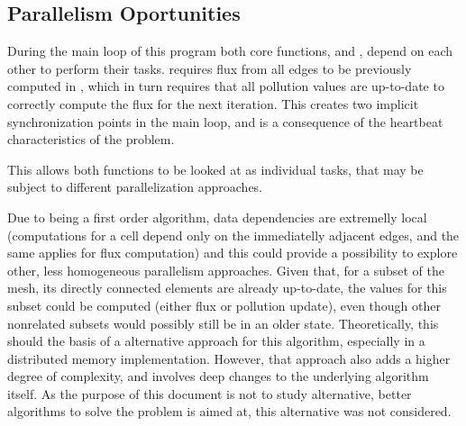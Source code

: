 \subsection{Parallelism Oportunities}

During the main loop of this program both core functions, \computeflux and \update, depend on each other to perform their tasks. \update requires flux from all edges to be previously computed in \computeflux, which in turn requires that all pollution values are up-to-date to correctly compute the flux for the next iteration. This creates two implicit synchronization points in the main loop, and is a consequence of the heartbeat characteristics of the problem.

This allows both functions to be looked at as individual tasks, that may be subject to different parallelization approaches.

Due to being a first order algorithm, data dependencies are extremelly local (computations for a cell depend only on the immediatelly adjacent edges, and the same applies for flux computation) and this could provide a possibility to explore other, less homogeneous parallelism approaches. Given that, for a subset of the mesh, its directly connected elements are already up-to-date, the values for this subset could be computed (either flux or pollution update), even though other nonrelated subsets would possibly still be in an older state. Theoretically, this should the basis of a alternative approach for this algorithm, especially in a distributed memory implementation. However, that approach also adds a higher degree of complexity, and involves deep changes to the underlying algorithm itself. As the purpose of this document is not to study alternative, better algorithms to solve the problem \polu is aimed at, this alternative was not considered.
